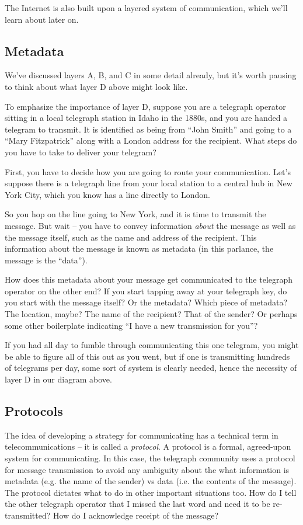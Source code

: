 \documentclass[UTF8]{book}
\begin{document}
\begin{CJK}{UTF8}{gbsn}
The Internet is also built upon a layered system of communication, which we'll learn about later on.

\subsection{Metadata}

We've discussed layers A, B, and C in some detail already, but it's worth pausing to think about what layer D above might look like.

To emphasize the importance of layer D, suppose you are a telegraph operator sitting in a local telegraph station in Idaho in the 1880s, and you are handed a telegram to transmit. It is identified as being from ``John Smith'' and going to a ``Mary Fitzpatrick'' along with a London address for the recipient. What steps do you have to take to deliver your telegram?

First, you have to decide how you are going to route your communication. Let's suppose there is a telegraph line from your local station to a central hub in New York City, which you know has a line directly to London.

So you hop on the line going to New York, and it is time to transmit the message. But wait -- you have to convey information \emph{about} the message as well as the message itself, such as the name and address of the recipient. This information about the message is known as metadata (in this parlance, the message is the ``data'').

How does this metadata about your message get communicated to the telegraph operator on the other end? If you start tapping away at your telegraph key, do you start with the message itself? Or the metadata? Which piece of metadata? The location, maybe? The name of the recipient? That of the sender? Or perhaps some other boilerplate indicating ``I have a new transmission for you''?

If you had all day to fumble through communicating this one telegram, you might be able to figure all of this out as you went, but if one is transmitting hundreds of telegrams per day, some sort of system is clearly needed, hence the necessity of layer D in our diagram above.

\subsection{Protocols}

The idea of developing a strategy for communicating has a technical term in telecommunications -- it is called a \emph{protocol}. A protocol is a formal, agreed-upon system for communicating. In this case, the telegraph community uses a protocol for message transmission to avoid any ambiguity about the what information is metadata (e.g. the name of the sender) vs data (i.e. the contents of the message). The protocol dictates what to do in other important situations too. How do I tell the other telegraph operator that I missed the last word and need it to be re-transmitted? How do I acknowledge receipt of the message?


\end{CJK}
\end{document}
